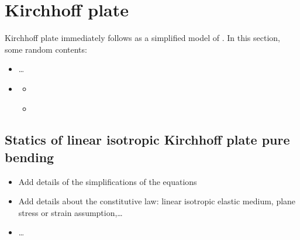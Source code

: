 \documentclass[letterpaper,10pt,english]{jupyterBook}
\begin{document}
\section{Kirchhoff plate}
\label{\detokenize{ch/solids/plates-shells/kirchhoff:kirchhoff-plate}}\label{\detokenize{ch/solids/plates-shells/kirchhoff:solid-mechanics-small-displacements-plates-shells-kirchhoff}}\label{\detokenize{ch/solids/plates-shells/kirchhoff::doc}}
\sphinxAtStartPar
Kirchhoff plate immediately follows as a simplified model of {\hyperref[\detokenize{ch/solids/plates-shells/timoshenko:solid-mechanics-small-displacements-plates-shells-timoshenko}]{}}. In this section, some random contents:
\begin{itemize}
\item {} 
\sphinxAtStartPar
…

\item {} 
\sphinxAtStartPar
{\hyperref[\detokenize{ch/solids/plates-shells/kirchhoff:solid-mechanics-small-displacements-plates-shells-kirchhoff-pure-bending}]{}}
\begin{itemize}
\item {} 
\sphinxAtStartPar
{\hyperref[\detokenize{ch/solids/plates-shells/kirchhoff:solid-mechanics-small-displacements-plates-shells-kirchhoff-pure-bending-analytical-sln}]{}}

\item {} 
\sphinxAtStartPar
{\hyperref[\detokenize{ch/solids/plates-shells/kirchhoff:solid-mechanics-small-displacements-plates-shells-kirchhoff-pure-bending-discussion}]{}}

\end{itemize}

\end{itemize}


\subsection{Statics of linear isotropic Kirchhoff plate \sphinxhyphen{} pure bending}
\label{\detokenize{ch/solids/plates-shells/kirchhoff:statics-of-linear-isotropic-kirchhoff-plate-pure-bending}}\label{\detokenize{ch/solids/plates-shells/kirchhoff:solid-mechanics-small-displacements-plates-shells-kirchhoff-pure-bending}}
\sphinxAtStartPar
{}
\begin{itemize}
\item {} 
\sphinxAtStartPar
Add details of the simplifications of the equations

\item {} 
\sphinxAtStartPar
Add details about the constitutive law: linear isotropic elastic medium, plane stress or strain assumption,…

\item {} 
\sphinxAtStartPar
…

\end{itemize}
\end{document}
